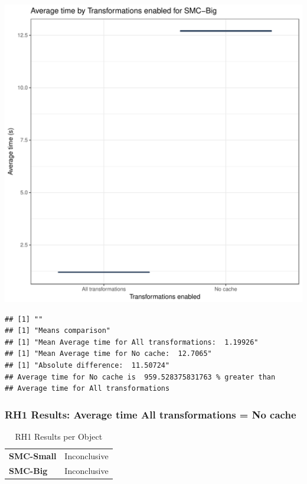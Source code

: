 \documentclass{article}\usepackage[]{graphicx}\usepackage[]{color}
\makeatletter
\def\maxwidth{ %
  \ifdim\Gin@nat@width>\linewidth
    \linewidth
  \else
    \Gin@nat@width
  \fi
}
\newenvironment{kframe}{%
 \def\at@end@of@kframe{}%
 \ifinner\ifhmode%
  \def\at@end@of@kframe{\end{minipage}}%
  \begin{minipage}{\columnwidth}%
 \fi\fi%
 \def\FrameCommand##1{\hskip\@totalleftmargin \hskip-\fboxsep
 \colorbox{shadecolor}{##1}\hskip-\fboxsep
     \hskip-\linewidth \hskip-\@totalleftmargin \hskip\columnwidth}%
 \MakeFramed {\advance\hsize-\width
   \@totalleftmargin\z@ \linewidth\hsize
   \@setminipage}}%
 {\par\unskip\endMakeFramed%
 \at@end@of@kframe}
\newenvironment{knitrout}{}{} %
\makeatother
\begin{document}
\begin{knitrout}
\color{fgcolor}
\includegraphics[width=\maxwidth]{figure/RH1_big-1} 
\begin{kframe}

{\ttfamily\noindent\bfseries\color{errorcolor}{\#\# Error in eval(expr, envir, enclos): object 'shap\_cashew\_big' not found}}\begin{verbatim}
## [1] ""
## [1] "Means comparison"
## [1] "Mean Average time for All transformations:  1.19926"
## [1] "Mean Average time for No cache:  12.7065"
## [1] "Absolute difference:  11.50724"
## Average time for No cache is  959.528375831763 % greater than 
## Average time for All transformations
\end{verbatim}
\end{kframe}
\end{knitrout}


 

	
	\subsubsection{RH1 Results: Average time All transformations = No cache}
	
	
	\begin{table}[H]
	\centering
	\caption{RH1 Results per Object}
	\begin{tabular}{ll}
	\textbf{SMC-Small} & Inconclusive \\
	\textbf{SMC-Big} & Inconclusive \\
	\end{tabular}
	\end{table}
\end{document}
